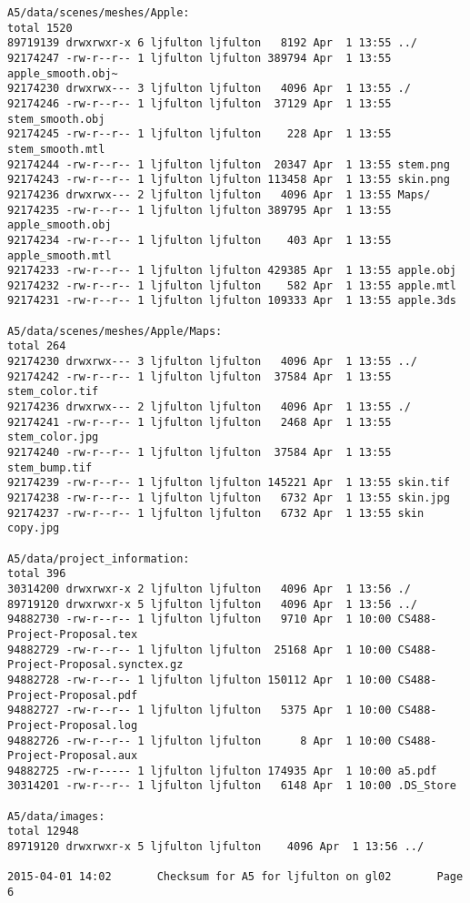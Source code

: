 \documentclass[12pt]{article}
\begin{document}
\begin{verbatim}
A5/data/scenes/meshes/Apple:
total 1520
89719139 drwxrwxr-x 6 ljfulton ljfulton   8192 Apr  1 13:55 ../
92174247 -rw-r--r-- 1 ljfulton ljfulton 389794 Apr  1 13:55 apple_smooth.obj~
92174230 drwxrwx--- 3 ljfulton ljfulton   4096 Apr  1 13:55 ./
92174246 -rw-r--r-- 1 ljfulton ljfulton  37129 Apr  1 13:55 stem_smooth.obj
92174245 -rw-r--r-- 1 ljfulton ljfulton    228 Apr  1 13:55 stem_smooth.mtl
92174244 -rw-r--r-- 1 ljfulton ljfulton  20347 Apr  1 13:55 stem.png
92174243 -rw-r--r-- 1 ljfulton ljfulton 113458 Apr  1 13:55 skin.png
92174236 drwxrwx--- 2 ljfulton ljfulton   4096 Apr  1 13:55 Maps/
92174235 -rw-r--r-- 1 ljfulton ljfulton 389795 Apr  1 13:55 apple_smooth.obj
92174234 -rw-r--r-- 1 ljfulton ljfulton    403 Apr  1 13:55 apple_smooth.mtl
92174233 -rw-r--r-- 1 ljfulton ljfulton 429385 Apr  1 13:55 apple.obj
92174232 -rw-r--r-- 1 ljfulton ljfulton    582 Apr  1 13:55 apple.mtl
92174231 -rw-r--r-- 1 ljfulton ljfulton 109333 Apr  1 13:55 apple.3ds

A5/data/scenes/meshes/Apple/Maps:
total 264
92174230 drwxrwx--- 3 ljfulton ljfulton   4096 Apr  1 13:55 ../
92174242 -rw-r--r-- 1 ljfulton ljfulton  37584 Apr  1 13:55 stem_color.tif
92174236 drwxrwx--- 2 ljfulton ljfulton   4096 Apr  1 13:55 ./
92174241 -rw-r--r-- 1 ljfulton ljfulton   2468 Apr  1 13:55 stem_color.jpg
92174240 -rw-r--r-- 1 ljfulton ljfulton  37584 Apr  1 13:55 stem_bump.tif
92174239 -rw-r--r-- 1 ljfulton ljfulton 145221 Apr  1 13:55 skin.tif
92174238 -rw-r--r-- 1 ljfulton ljfulton   6732 Apr  1 13:55 skin.jpg
92174237 -rw-r--r-- 1 ljfulton ljfulton   6732 Apr  1 13:55 skin copy.jpg

A5/data/project_information:
total 396
30314200 drwxrwxr-x 2 ljfulton ljfulton   4096 Apr  1 13:56 ./
89719120 drwxrwxr-x 5 ljfulton ljfulton   4096 Apr  1 13:56 ../
94882730 -rw-r--r-- 1 ljfulton ljfulton   9710 Apr  1 10:00 CS488-Project-Proposal.tex
94882729 -rw-r--r-- 1 ljfulton ljfulton  25168 Apr  1 10:00 CS488-Project-Proposal.synctex.gz
94882728 -rw-r--r-- 1 ljfulton ljfulton 150112 Apr  1 10:00 CS488-Project-Proposal.pdf
94882727 -rw-r--r-- 1 ljfulton ljfulton   5375 Apr  1 10:00 CS488-Project-Proposal.log
94882726 -rw-r--r-- 1 ljfulton ljfulton      8 Apr  1 10:00 CS488-Project-Proposal.aux
94882725 -rw-r----- 1 ljfulton ljfulton 174935 Apr  1 10:00 a5.pdf
30314201 -rw-r--r-- 1 ljfulton ljfulton   6148 Apr  1 10:00 .DS_Store

A5/data/images:
total 12948
89719120 drwxrwxr-x 5 ljfulton ljfulton    4096 Apr  1 13:56 ../

2015-04-01 14:02       Checksum for A5 for ljfulton on gl02       Page 6


\end{verbatim}
\end{document}

